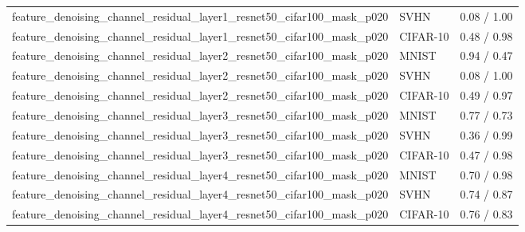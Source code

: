 \begin{tabular}{lll}
feature\_denoising\_channel\_residual\_layer1\_resnet50\_cifar100\_mask\_p020 & SVHN & 0.08 / 1.00 \\
feature\_denoising\_channel\_residual\_layer1\_resnet50\_cifar100\_mask\_p020 & CIFAR-10 & 0.48 / 0.98 \\
feature\_denoising\_channel\_residual\_layer2\_resnet50\_cifar100\_mask\_p020 & MNIST & 0.94 / 0.47 \\
feature\_denoising\_channel\_residual\_layer2\_resnet50\_cifar100\_mask\_p020 & SVHN & 0.08 / 1.00 \\
feature\_denoising\_channel\_residual\_layer2\_resnet50\_cifar100\_mask\_p020 & CIFAR-10 & 0.49 / 0.97 \\
feature\_denoising\_channel\_residual\_layer3\_resnet50\_cifar100\_mask\_p020 & MNIST & 0.77 / 0.73 \\
feature\_denoising\_channel\_residual\_layer3\_resnet50\_cifar100\_mask\_p020 & SVHN & 0.36 / 0.99 \\
feature\_denoising\_channel\_residual\_layer3\_resnet50\_cifar100\_mask\_p020 & CIFAR-10 & 0.47 / 0.98 \\
feature\_denoising\_channel\_residual\_layer4\_resnet50\_cifar100\_mask\_p020 & MNIST & 0.70 / 0.98 \\
feature\_denoising\_channel\_residual\_layer4\_resnet50\_cifar100\_mask\_p020 & SVHN & 0.74 / 0.87 \\
feature\_denoising\_channel\_residual\_layer4\_resnet50\_cifar100\_mask\_p020 & CIFAR-10 & 0.76 / 0.83 \\
\bottomrule
\end{tabular}
